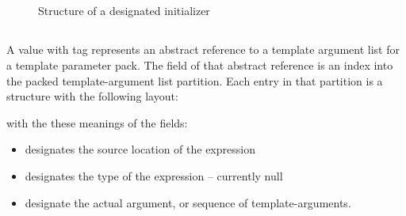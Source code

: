 \subsection{}
\label{sec:ifc:ExprSort:DesignatedInitializer}

\begin{figure}[H]
	\centering
	\caption{Structure of a designated initializer}
	\label{fig:ifc-designated-initializer-structure}
\end{figure}


\subsection{}
\label{sec:ifc:ExprSort:PackedTemplateArguments}

A  value with tag  represents an
abstract reference to a template argument list for a template parameter pack.  The 
 field of that abstract reference is an index into the packed template-argument
list partition.  Each entry in that partition is a structure with the following layout:
%
\begin{figure}[H]
	\centering
\end{figure}
%
with the these meanings of the fields:
\begin{itemize}
	\item {} designates the source location of the expression
	\item {} designates the type of the expression -- currently null
	\item {} designate the actual argument, or sequence of template-arguments.
\end{itemize}


